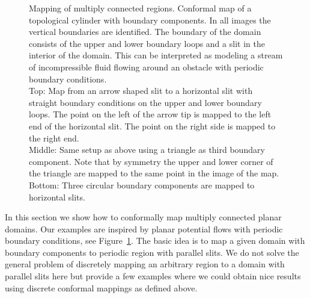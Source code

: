 \documentclass[Thesis.tex]{subfiles}
\begin{document}
\begin{figure}
	\centering
\caption{
Mapping of multiply connected regions.
Conformal map of a topological cylinder with boundary components.
In all images the vertical boundaries are identified.
The boundary of the domain consists of the upper and lower boundary loops and a slit in the interior of the domain.
This can be interpreted as modeling a stream of incompressible fluid flowing around an obstacle with periodic boundary conditions.
\\
Top: Map from an arrow shaped slit to a horizontal slit with straight boundary conditions on the upper and lower boundary loops.
The point on the left of the arrow tip is mapped to the left end of the horizontal slit.
The point on the right side is mapped to the right end.
\\
Middle: Same setup as above using a triangle as third boundary component.
Note that by symmetry the upper and lower corner of the triangle are mapped to the same point in the image of the map.
\\
Bottom: Three circular boundary components are mapped to horizontal slits.
}
\label{fig:fluid_flows}
\end{figure}

In this section we show how to conformally map multiply connected planar domains.
Our examples are inspired by planar potential flows with periodic boundary conditions, see Figure~\ref{fig:fluid_flows}.
The basic idea is to map a given domain with boundary components to periodic region with parallel slits.
We do not solve the general problem of discretely mapping an arbitrary region to a domain with parallel slits here but provide a few examples where we could obtain nice results using discrete conformal mappings as defined above.
\end{document}
